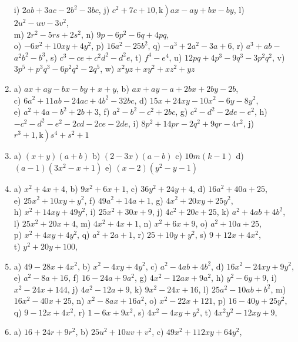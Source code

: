 \documentclass[10pt]{article}
\begin{document}
\begin{enumerate}
i) \(2 a b+3 a c-2 b^{2}-3 b c\), j) \(\left.c^{2}+7 c+10, \mathrm{k}\right) a x-a y+b x-b y\), l) \(2 u^{2}-u v-3 v^{2}\),\\
m) \(2 r^{2}-5 r s+2 s^{2}\), n) \(9 p-6 p^{2}-6 q+4 p q\),\\
o) \(-6 x^{2}+10 x y+4 y^{2}\), p) \(16 a^{2}-25 b^{2}\), q) \(-a^{3}+2 a^{2}-3 a+6\), r) \(a^{3}+a b-\) \(a^{2} b^{2}-b^{3}\), s) \(c^{3}-c e+c^{2} d^{2}-d^{2} e\), t) \(f^{4}-e^{4}\), u) \(12 p q+4 p^{3}-9 q^{3}-3 p^{2} q^{2}\), v) \(3 p^{5}+p^{3} q^{3}-6 p^{2} q^{2}-2 q^{5}\), w) \(x^{2} y z+x y^{2}+x z^{2}+y z\)
  \item a) \(a x+a y-b x-b y+x+y\), b) \(a x+a y-a+2 b x+2 b y-2 b\),\\
c) \(6 a^{2}+11 a b-24 a c+4 b^{2}-32 b c\), d) \(15 x+24 x y-10 x^{2}-6 y-8 y^{2}\),\\
e) \(a^{2}+4 a-b^{2}+2 b+3\), f) \(a^{2}-b^{2}-c^{2}+2 b c\), g) \(c^{2}-d^{2}-2 d e-e^{2}\), h) \(-c^{2}-d^{2}-e^{2}-2 c d-2 c e-2 d e\), i) \(8 p^{2}+14 p r-2 q^{2}+9 q r-4 r^{2}\), j) \(\left.r^{3}+1, \mathrm{k}\right) s^{4}+s^{2}+1\)
  \item a) \((x+y)(a+b)\) b) \((2-3 x)(a-b)\) c) \(10 m(k-1)\) d) \((a-1)\left(3 x^{2}-x+1\right)\) e) \((x-2)\left(y^{2}-y-1\right)\)
  \item a) \(x^{2}+4 x+4\), b) \(9 x^{2}+6 x+1\), c) \(36 y^{2}+24 y+4\), d) \(16 a^{2}+40 a+25\),\\
e) \(25 x^{2}+10 x y+y^{2}\), f) \(49 a^{2}+14 a+1\), g) \(4 x^{2}+20 x y+25 y^{2}\),\\
h) \(x^{2}+14 x y+49 y^{2}\), i) \(25 x^{2}+30 x+9\), j) \(4 c^{2}+20 c+25\), k) \(a^{2}+4 a b+4 b^{2}\),\\
l) \(25 x^{2}+20 x+4\), m) \(4 x^{2}+4 x+1\), n) \(x^{2}+6 x+9\), o) \(a^{2}+10 a+25\),\\
p) \(x^{2}+4 x y+4 y^{2}\), q) \(a^{2}+2 a+1\), r) \(25+10 y+y^{2}\), s) \(9+12 x+4 x^{2}\),\\
t) \(y^{2}+20 y+100\),
  \item a) \(49-28 x+4 x^{2}\), b) \(x^{2}-4 x y+4 y^{2}\), c) \(a^{2}-4 a b+4 b^{2}\), d) \(16 x^{2}-24 x y+9 y^{2}\), e) \(a^{2}-8 a+16\), f) \(16-24 a+9 a^{2}\), g) \(4 x^{2}-12 a x+9 a^{2}\), h) \(y^{2}-6 y+9\), i) \(x^{2}-24 x+144\), j) \(4 a^{2}-12 a+9\), k) \(9 x^{2}-24 x+16\), l) \(25 a^{2}-10 a b+b^{2}\), m) \(16 x^{2}-40 x+25\), n) \(x^{2}-8 a x+16 a^{2}\), o) \(x^{2}-22 x+121\), p) \(16-40 y+25 y^{2}\), q) \(9-12 x+4 x^{2}\), r) \(1-6 x+9 x^{2}\), s) \(4 x^{2}-4 x y+y^{2}\), t) \(4 x^{2} y^{2}-12 x y+9\),
  \item a) \(16+24 r+9 r^{2}\), b) \(25 u^{2}+10 u v+v^{2}\), c) \(49 x^{2}+112 x y+64 y^{2}\),\\

\end{enumerate}
\end{document}
